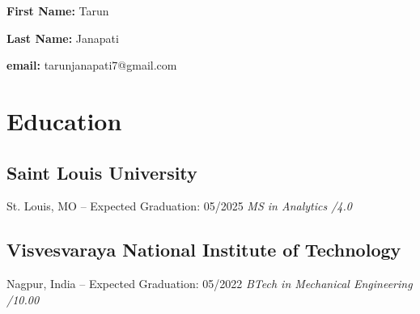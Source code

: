 \documentclass{article}
\begin{document}
      
      \textbf{First Name:} Tarun
      \par
      \textbf{Last Name:} Janapati
      \par
      \textbf{email:} tarunjanapati7@gmail.com
      
      \section*{Education}
      
      
        \subsection*{Saint Louis University}
        St. Louis, MO -- Expected Graduation: 05/2025
        \textit{MS in Analytics /4.0}
      

        \subsection*{Visvesvaraya National Institute of Technology}
        Nagpur, India -- Expected Graduation: 05/2022
        \textit{BTech in Mechanical Engineering /10.00}
      
      
      
      
\end{document}
